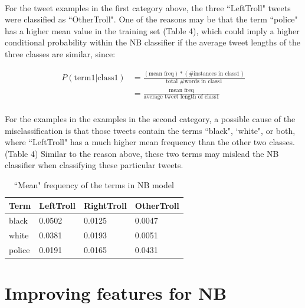 \documentclass[11pt]{article}
\begin{document}
\paragraph{} For the tweet examples in the first category above, the three ``LeftTroll" tweets were classified as ``OtherTroll". One of the reasons may be that the term ``police" has a higher mean value in the training set (Table 4), which could imply a higher conditional probability within the NB classifier if the average tweet lengths of the three classes are similar, since:

\begin{equation*}
\begin{split} 
P(\text{term1} | \text{class1}) &= \frac{(\text{mean freq}) * (\text{\# instances in class1})}{\text{total \# words in class1}} \\
& = \frac{\text{mean freq}}{\text{average tweet length of class1}}
\end{split}
\end{equation*}

\paragraph{} For the examples in the examples in the second category, a possible cause of the misclassification is that those tweets contain the terms ``black", `white", or both, where ``LeftTroll" has a much higher mean frequency than the other two classes. (Table 4) Similar to the reason above, these two terms may mislead the NB classifier when classifying these particular tweets.

\begin{table}[!htbp]
 \begin{center}
\begin{tabular}{| l | l | l | l |}
      \hline
      Term & LeftTroll & RightTroll & OtherTroll \\
      \hline\hline
      black & 0.0502 & 0.0125 & 0.0047 \\
      white & 0.0381 & 0.0193 & 0.0051 \\
      police & 0.0191 & 0.0165 & 0.0431 \\
      \hline
\end{tabular}
\caption{``Mean" frequency of the terms in NB model}\label{table2}
 \end{center}
\end{table}


\section{Improving features for NB}
\end{document}

